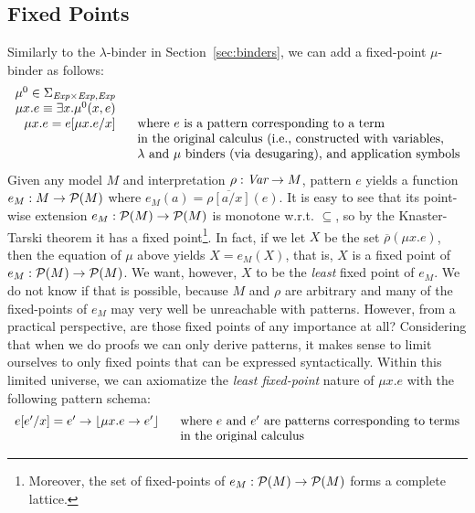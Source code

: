 \documentclass[UTF8,11pt]{article}
\theoremstyle{plain}
\theoremstyle{definition}
\theoremstyle{remark}
\DeclarePairedDelimiter{\floor}{\lfloor}{\rfloor}
\newcommand{\Exp}{\textit{Exp}}
\newcommand{\ra}{\rightarrow}
\begin{document}
\subsection{Fixed Points}
\label{sec:fixed-points}

Similarly to the $\lambda$-binder in Section~\ref{sec:binders}, we can
add a fixed-point $\mu$-binder as follows:
$$
\begin{array}{r@{\hspace*{4ex}}l}
\mu^0 \in \Sigma_{\Exp\times\Exp,\Exp}
\\
\mu x . e \equiv \exists x . \mu^0(x,e)
\\
\mu x . e = e[\mu x.e/x]
& \textrm{where $e$ is a pattern corresponding to a term}
\\
& \textrm{in the original calculus (i.e., constructed with variables,}
\\
& \textrm{$\lambda$ and $\mu$ binders (via desugaring), and application symbols}
\end{array}
$$
Given any model $M$ and interpretation $\rho : \Var \ra M$, pattern $e$
yields a function $e_M : M \rightarrow {\cal P}(M)$ where
$e_M(a) = \overline{\rho[a/x]}(e)$.
It is easy to see that its point-wise extension 
$e_M : {\cal P}(M) \rightarrow {\cal P}(M)$ is monotone w.r.t. $\subseteq$,
so by the Knaster-Tarski theorem it has a fixed point\footnote{
Moreover, the set of fixed-points of
$e_M : {\cal P}(M) \rightarrow {\cal P}(M)$ forms a complete lattice.}.
In fact, if we let $X$ be the set $\overline{\rho}(\mu x . e)$, then
the equation of $\mu$ above yields $X = e_M(X)$, that is, $X$ is a fixed point
of $e_M : {\cal P}(M) \rightarrow {\cal P}(M)$.
%
We want, however, $X$ to be the \emph{least} fixed point of $e_M$.
We do not know if that is possible, because $M$ and $\rho$ are arbitrary
and many of the fixed-points of $e_M$ may very well be unreachable with
patterns.
However, from a practical perspective, are those fixed points of any
importance at all?
Considering that when we do proofs we can only derive patterns, it makes
sense to limit ourselves to only fixed points that can be expressed
syntactically.
Within this limited universe, we can axiomatize the
\emph{least fixed-point} nature of $\mu x . e$ with the following
pattern schema:
$$
\begin{array}{r@{\hspace*{4ex}}l}
e[e'/x] = e' \rightarrow \floor{\mu x . e \rightarrow e'}
& \textrm{where $e$ and $e'$ are patterns corresponding to terms}
\\
& \textrm{in the original calculus}
\end{array}
$$
\end{document}
